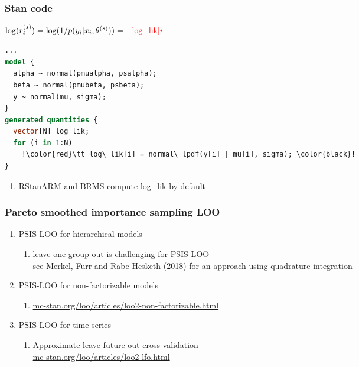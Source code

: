 \documentclass[10pt]{beamer}
\begin{document}
\begin{frame}[fragile]

\frametitle{Stan code }

  \vspace{\baselineskip}
  $ \log(r_i^{(s)}) = \log(1/p(y_i|x_i,\theta^{(s)})) = {\color{red}-\mbox{log\_lik}[i]}$
  \vspace{\baselineskip}

  \pause
  {\small
\begin{lstlisting}[language=Stan,escapechar=!]
...
model {
  alpha ~ normal(pmualpha, psalpha);
  beta ~ normal(pmubeta, psbeta);
  y ~ normal(mu, sigma);
}
generated quantities {
  vector[N] log_lik;
  for (i in 1:N)
    !\color{red}\tt log\_lik[i] = normal\_lpdf(y[i] | mu[i], sigma); \color{black}!
}
\end{lstlisting}
  }

  \begin{enumerate}
  \item<3-> RStanARM and BRMS compute log\_lik by default
  \end{enumerate}

\end{frame}

\begin{frame}{}

\frametitle{ Pareto smoothed importance sampling LOO}

\begin{enumerate}
\item PSIS-LOO for hierarchical models
  \begin{enumerate}
  \item leave-one-group out is challenging for PSIS-LOO\\ \vspace{0.2\baselineskip}
    {\small see Merkel, Furr and Rabe-Hesketh
      (2018) for an approach using quadrature integration}
  \end{enumerate}
  \item<2-> PSIS-LOO for non-factorizable models
    \begin{enumerate}
    \item {\url{mc-stan.org/loo/articles/loo2-non-factorizable.html}}
    \end{enumerate}
  \item<3-> PSIS-LOO for time series
  \begin{enumerate}
  \item Approximate leave-future-out cross-validation \\ \vspace{0.2\baselineskip}
    {\url{mc-stan.org/loo/articles/loo2-lfo.html}}
  \end{enumerate}
\end{enumerate}

\end{frame}
\end{document}
